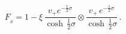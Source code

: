 \begin{equation}\label{boro229}
F_{_{\!S}}=1-\xi\,\frac{v_{+}e^{-\frac{1}{2}\sigma}}
{\cosh\,\frac{1}{2}\sigma}\otimes \frac{v_+ \, e^{-\frac{1}{2}\sigma}}
{\cosh\,\frac{1}{2}\sigma}\,.
\end{equation}

